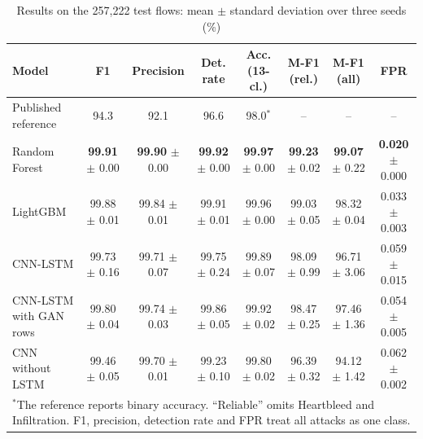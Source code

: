 \documentclass[conference]{IEEEtran}
\begin{document}
\begin{table}[t]
\caption{Results on the 257,222 test flows: mean $\pm$ standard deviation over three seeds (\%)}
\label{tab:main}
\centering
\scriptsize
\setlength{\tabcolsep}{3pt}
\begin{tabular}{lccccccc}
\toprule
Model & F1 & Precision & Det. rate & Acc. (13-cl.) & M-F1 (rel.) & M-F1 (all) & FPR \\
\midrule
Published reference \cite{refpaper2025} & 94.3 & 92.1 & 96.6 & 98.0$^\ast$ & -- & -- & -- \\
Random Forest & \textbf{99.91} $\pm$ 0.00 & \textbf{99.90} $\pm$ 0.00 & \textbf{99.92} $\pm$ 0.00 & \textbf{99.97} $\pm$ 0.00 & \textbf{99.23} $\pm$ 0.02 & \textbf{99.07} $\pm$ 0.22 & \textbf{0.020} $\pm$ 0.000 \\
LightGBM & 99.88 $\pm$ 0.01 & 99.84 $\pm$ 0.01 & 99.91 $\pm$ 0.01 & 99.96 $\pm$ 0.00 & 99.03 $\pm$ 0.05 & 98.32 $\pm$ 0.04 & 0.033 $\pm$ 0.003 \\
CNN-LSTM & 99.73 $\pm$ 0.16 & 99.71 $\pm$ 0.07 & 99.75 $\pm$ 0.24 & 99.89 $\pm$ 0.07 & 98.09 $\pm$ 0.99 & 96.71 $\pm$ 3.06 & 0.059 $\pm$ 0.015 \\
CNN-LSTM with GAN rows & 99.80 $\pm$ 0.04 & 99.74 $\pm$ 0.03 & 99.86 $\pm$ 0.05 & 99.92 $\pm$ 0.02 & 98.47 $\pm$ 0.25 & 97.46 $\pm$ 1.36 & 0.054 $\pm$ 0.005 \\
CNN without LSTM & 99.46 $\pm$ 0.05 & 99.70 $\pm$ 0.01 & 99.23 $\pm$ 0.10 & 99.80 $\pm$ 0.02 & 96.39 $\pm$ 0.32 & 94.12 $\pm$ 1.42 & 0.062 $\pm$ 0.002 \\
\bottomrule
\multicolumn{8}{l}{$^\ast$The reference reports binary accuracy. ``Reliable'' omits Heartbleed and Infiltration. F1, precision, detection rate and FPR treat all attacks as one class.}
\end{tabular}
\end{table}
\end{document}
